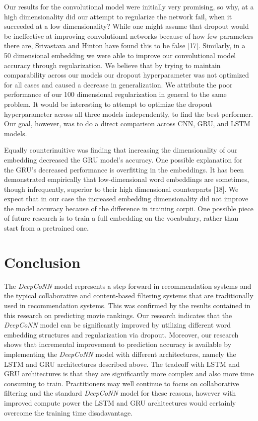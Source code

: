 \documentclass[10pt, twocolumn, letterpaper]{article}
\begin{document}
Our results for the convolutional model were initially very promising, so why, at a high dimensionality did our attempt to regularize the network fail, when it succeeded at a low dimensionality? While one might assume that dropout would be ineffective at improving convolutional networks because of how few parameters there are, Srivastava and Hinton have found this to be false [17]. Similarly, in a 50 dimensional embedding we were able to improve our convolutional model accuracy through regularization. We believe that by trying to maintain comparability across our models our dropout hyperparameter was not optimized for all cases and caused a decrease in generalization. We attribute the poor performance of our 100 dimensional regularization in general to the same problem. It would be interesting to attempt to optimize the dropout hyperparameter across all three models independently, to find the best performer. Our goal, however, was to do a direct comparison across CNN, GRU, and LSTM models.

Equally counterinuitive was finding that increasing the dimensionality of our embedding decreased the GRU model's accuracy. One possible explanation for the GRU's decreased performance is overfitting in the embeddings. It has been demonstrated empirically that low-dimensional word embeddings are sometimes, though infrequently, superior to their high dimensional counterparts [18]. We expect that in our case the increased embedding dimensionality did not improve the model accuracy because of the difference in training corpii. One possible piece of future research is to train a full embedding on the vocabulary, rather than start from a pretrained one.

\section{Conclusion}

The \textit{DeepCoNN} model represents a step forward in recommendation systems and the typical collaborative and content-based filtering systems that are traditionally used in recommendation systems. This was confirmed by the results contained in this research on predicting movie rankings. Our research indicates that the \textit{DeepCoNN} model can be significantly improved by utilizing different word embedding structures and regularization via dropout. Moreover, our research shows that incremental improvement to prediction accuracy is available by implementing the \textit{DeepCoNN} model with different architectures, namely the LSTM and GRU architectures described above. The tradeoff with LSTM and GRU architectures is that they are significantly more complex and also more time consuming to train. Practitioners may well continue to focus on collaborative filtering and the standard \textit{DeepCoNN} model for these reasons, however with improved compute power the LSTM and GRU architectures would certainly overcome the training time disadavantage.
\end{document}
